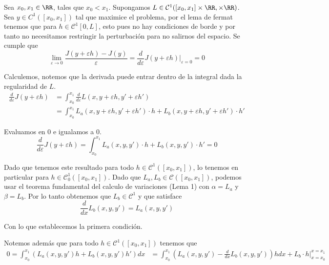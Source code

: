 \documentclass[a4paper,oneside,10.5pt]{USMArt}
\begin{document}
\begin{sol}
  Sea $x_{0}, x_{1} \in \RR$, tales que $x_{0} < x_{1}$. Supongamos
  $L \in \mathcal{C}^{1}([x_{0}, x_{1}] \times \RR, \times \RR)$. Sea $y \in C^{1}([x_{0}, x_{1}])$ tal que maximice
  el problema, por el lema de fermat tenemos que para $h \in \mathcal{C}^{1}[0, L]$, esto
  pues no hay condiciones de borde y por tanto no necesitamos restringir la perturbación para
  no salirnos del espacio. Se cumple que
  \begin{equation*}
    \lim_{\varepsilon \to 0} \frac{J(y + \varepsilon h) - J(y)}{\varepsilon} = \frac{d}{d\varepsilon} J(y + \varepsilon h)|_{\varepsilon = 0} = 0
  \end{equation*}

  Calculemos, notemos que la derivada puede entrar dentro de la integral dada la regularidad de $L$.
  \begin{align*}
    \frac{d}{d\varepsilon} J(y + \varepsilon h) &= \int_{x_{0}}^{x_{1}} \frac{d}{d\varepsilon} L(x, y + \varepsilon h, y' + \varepsilon h')\\
    &= \int_{x_{0}}^{x_{1}} L_{a}(x, y + \varepsilon h, y' + \varepsilon h') \cdot h + L_{b}(x, y + \varepsilon h, y' + \varepsilon h') \cdot h'
  \end{align*}

  Evaluamos en $0$ e igualamos a $0$.
  \begin{equation*}
    \frac{d}{d\varepsilon} J(y + \varepsilon h) = \int_{x_{0}}^{x_{1}} L_{a}(x, y, y') \cdot h + L_{b}(x, y, y') \cdot h' = 0
  \end{equation*}

  Dado que tenemos este resultado para todo $h \in \mathcal{C}^{1}([x_{0}, x_{1}])$, lo tenemos en particular para
  $h \in \mathcal{C}_{0}^{1}([x_{0}, x_{1}])$. Dado que $L_{a}, L_{b} \in \mathcal{C}([x_{0}, x_{1}])$, podemos usar
  el teorema fundamental del calculo de variaciones (Lema 1) con $\alpha = L_{a}$ y $\beta = L_{b}$. Por lo tanto
  obtenemos que $L_{b} \in \mathcal{C}^{1}$ y que satisface
  \begin{equation*}
    \frac{d}{dx} L_{b}(x, y, y') = L_{a}(x, y, y')
  \end{equation*}

  Con lo que establecemos la primera condición.

  Notemos además que para todo $h \in \mathcal{C}^{1}([x_{0}, x_{1}])$ tenemos que
  \begin{align*}
   0 = \int_{x_{0}}^{x_{1}} (L_{a}(x, y, y')h + L_{b}(x, y , y')h') dx &= \int_{x_{0}}^{x_{1}} (L_{a}(x, y, y') - \frac{d}{dx} L_{b}(x, y, y'))h  dx + L_{b} \cdot h|_{x = x_{0}}^{x = x_{1}}
  \end{align*}


\end{sol}
\end{document}
